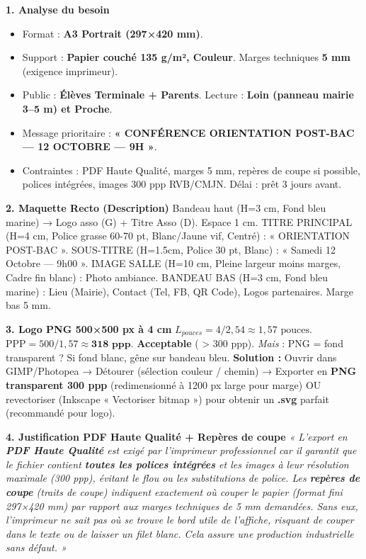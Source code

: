 \documentclass[11pt]{article}
\begin{document}
\begin{corrige}
\textbf{1. Analyse du besoin}
\begin{itemize}
    \item Format : \textbf{A3 Portrait (297×420 mm)}.
    \item Support : \textbf{Papier couché 135 g/m², Couleur}. Marges techniques \textbf{5 mm} (exigence imprimeur).
    \item Public : \textbf{Élèves Terminale + Parents}. Lecture : \textbf{Loin (panneau mairie 3--5 m) et Proche}.
    \item Message prioritaire : \textbf{« CONFÉRENCE ORIENTATION POST-BAC — 12 OCTOBRE — 9H »}.
    \item Contraintes : PDF Haute Qualité, marges 5 mm, repères de coupe si possible, polices intégrées, images 300 ppp RVB/CMJN. Délai : prêt 3 jours avant.
\end{itemize}

\textbf{2. Maquette Recto (Description)}
Bandeau haut (H=3 cm, Fond bleu marine) → Logo asso (G) + Titre Asso (D). Espace 1 cm.
TITRE PRINCIPAL (H=4 cm, Police grasse 60-70 pt, Blanc/Jaune vif, Centré) : « ORIENTATION POST-BAC ».
SOUS-TITRE (H=1.5cm, Police 30 pt, Blanc) : « Samedi 12 Octobre — 9h00 ».
IMAGE SALLE (H=10 cm, Pleine largeur moins marges, Cadre fin blanc) : Photo ambiance.
BANDEAU BAS (H=3 cm, Fond bleu marine) : Lieu (Mairie), Contact (Tel, FB, QR Code), Logos partenaires. Marge bas 5 mm.

\textbf{3. Logo PNG 500×500 px à 4 cm}
$L_{pouces} = 4 / 2,54 \approx 1,57 \text{ pouces}$.
$\text{PPP} = 500 / 1,57 \approx \mathbf{318 \text{ ppp}}$.
\textbf{Acceptable} ( > 300 ppp). \textit{Mais} : PNG = fond transparent ? Si fond blanc, gêne sur bandeau bleu. \textbf{Solution :} Ouvrir dans GIMP/Photopea → Détourer (sélection couleur / chemin) → Exporter en \textbf{PNG transparent 300 ppp} (redimensionné à 1200 px large pour marge) OU revectoriser (Inkscape « Vectoriser bitmap ») pour obtenir un \textbf{.svg} parfait (recommandé pour logo).

\textbf{4. Justification PDF Haute Qualité + Repères de coupe}
\textit{« L'export en \textbf{PDF Haute Qualité} est exigé par l'imprimeur professionnel car il garantit que le fichier contient \textbf{toutes les polices intégrées} et les images à leur résolution maximale (300 ppp), évitant le flou ou les substitutions de police. Les \textbf{repères de coupe} (traits de coupe) indiquent exactement où couper le papier (format fini 297×420 mm) par rapport aux marges techniques de 5 mm demandées. Sans eux, l'imprimeur ne sait pas où se trouve le bord utile de l'affiche, risquant de couper dans le texte ou de laisser un filet blanc. Cela assure une production industrielle sans défaut. »}
\end{corrige}
\end{document}
